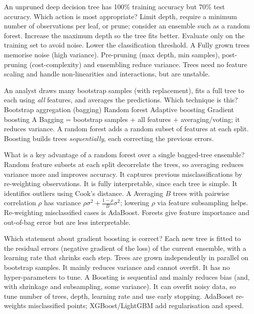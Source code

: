 {An unpruned deep decision tree has 100\% training accuracy but 70\% test accuracy. Which action is most appropriate?}
{Limit depth, require a minimum number of observations per leaf, or prune; consider an ensemble such as a random forest.}
{Increase the maximum depth so the tree fits better.}
{Evaluate only on the training set to avoid noise.}
{Lower the classification threshold.}
{A}
{Fully grown trees memorise noise (high variance). Pre-pruning (max depth, min samples), post-pruning (cost-complexity) and ensembling reduce variance. Trees need no feature scaling and handle non-linearities and interactions, but are unstable.}

{An analyst draws many bootstrap samples (with replacement), fits a full tree to each using \emph{all} features, and averages the predictions. Which technique is this?}
{Bootstrap aggregation (bagging)}
{Random forest}
{Adaptive boosting}
{Gradient boosting}
{A}
{Bagging = bootstrap samples + all features + averaging/voting; it reduces variance. A random forest adds a random subset of features at each split. Boosting builds trees \emph{sequentially}, each correcting the previous errors.}

{What is a key advantage of a random forest over a single bagged-tree ensemble?}
{Random feature subsets at each split decorrelate the trees, so averaging reduces variance more and improves accuracy.}
{It captures previous misclassifications by re-weighting observations.}
{It is fully interpretable, since each tree is simple.}
{It identifies outliers using Cook's distance.}
{A}
{Averaging $B$ trees with pairwise correlation $\rho$ has variance $\rho\sigma^2+\frac{1-\rho}{B}\sigma^2$; lowering $\rho$ via feature subsampling helps. Re-weighting misclassified cases is AdaBoost. Forests give feature importance and out-of-bag error but are less interpretable.}

{Which statement about gradient boosting is correct?}
{Each new tree is fitted to the residual errors (negative gradient of the loss) of the current ensemble, with a learning rate that shrinks each step.}
{Trees are grown independently in parallel on bootstrap samples.}
{It mainly reduces variance and cannot overfit.}
{It has no hyper-parameters to tune.}
{A}
{Boosting is sequential and mainly reduces bias (and, with shrinkage and subsampling, some variance). It can overfit noisy data, so tune number of trees, depth, learning rate and use early stopping. AdaBoost re-weights misclassified points; XGBoost/LightGBM add regularisation and speed.}

